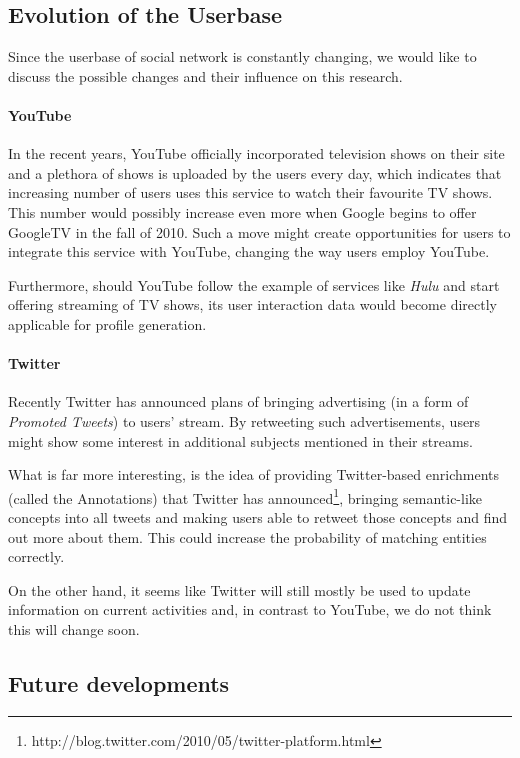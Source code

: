 \subsection{Evolution of the Userbase}

Since the userbase of social network is constantly changing, we would like to
discuss the possible changes and their influence on this research.

\paragraph{YouTube}


In the recent years, YouTube officially incorporated television shows on their
site \cite{youtube-tv-shows} and a plethora of shows is uploaded by the users
every day, which indicates that increasing number of users uses this service to
watch their favourite TV shows. This number would possibly increase even more
when Google begins to offer GoogleTV in the
fall of 2010. Such a move might create opportunities for users to integrate
this service with YouTube, changing the way users employ YouTube.

Furthermore, should YouTube follow the example of services like \textit{Hulu}
and start offering streaming of TV shows, its user interaction data would become
directly applicable for profile generation.

\paragraph{Twitter}

Recently Twitter has announced plans of bringing advertising (\eg in a form of
\textit{Promoted Tweets}) to users' stream.  By retweeting such advertisements,
users might show some interest in additional subjects mentioned in their
streams.

What is far more interesting, is the idea of providing Twitter-based
enrichments (called the Annotations) that Twitter has announced\footnote{http://blog.twitter.com/2010/05/twitter-platform.html},
bringing semantic-like concepts into all tweets and making users able to
retweet those concepts and find out more about them. This could increase
the probability of matching entities correctly.

On the other hand, it seems like Twitter will still mostly be used to update
information on current activities and, in contrast to YouTube, we do not think
this will change soon.

\subsection{Future developments}

